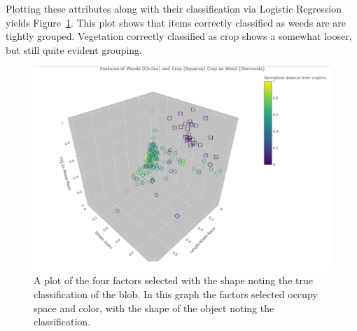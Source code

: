 \documentclass[letterpaper]{article}
\begin{document}
{Plotting these attributes along with their classification via Logistic Regression yields Figure~\ref{fig:factors}. This plot shows that items correctly classified as weeds are are tightly grouped. Vegetation correctly classified as crop shows a somewhat looser, but still quite evident grouping.
 \begin{figure}[H]
	\centering
	\includegraphics[width=0.9\linewidth]{./figures/plot-factors.png}
	\caption[Factors selected for discrimination]{A plot of the four factors selected with the shape noting the true classification of the blob. In this graph the factors selected occupy space and color, with the shape of the object noting the classification.}
	\label{fig:factors}
\end{figure}
  
}
\end{document}
